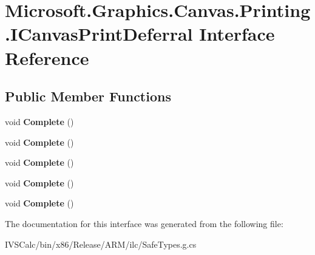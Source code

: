 \hypertarget{interface_microsoft_1_1_graphics_1_1_canvas_1_1_printing_1_1_i_canvas_print_deferral}{}\section{Microsoft.\+Graphics.\+Canvas.\+Printing.\+I\+Canvas\+Print\+Deferral Interface Reference}
\label{interface_microsoft_1_1_graphics_1_1_canvas_1_1_printing_1_1_i_canvas_print_deferral}
\subsection*{Public Member Functions}
\begin{DoxyCompactItemize}
\item 
\mbox{\label{interface_microsoft_1_1_graphics_1_1_canvas_1_1_printing_1_1_i_canvas_print_deferral_ad94fb062f9b4b578b0f9e7ac5c38055e}} 
void {\bfseries Complete} ()
\item 
\mbox{\label{interface_microsoft_1_1_graphics_1_1_canvas_1_1_printing_1_1_i_canvas_print_deferral_ad94fb062f9b4b578b0f9e7ac5c38055e}} 
void {\bfseries Complete} ()
\item 
\mbox{\label{interface_microsoft_1_1_graphics_1_1_canvas_1_1_printing_1_1_i_canvas_print_deferral_ad94fb062f9b4b578b0f9e7ac5c38055e}} 
void {\bfseries Complete} ()
\item 
\mbox{\label{interface_microsoft_1_1_graphics_1_1_canvas_1_1_printing_1_1_i_canvas_print_deferral_ad94fb062f9b4b578b0f9e7ac5c38055e}} 
void {\bfseries Complete} ()
\item 
\mbox{\label{interface_microsoft_1_1_graphics_1_1_canvas_1_1_printing_1_1_i_canvas_print_deferral_ad94fb062f9b4b578b0f9e7ac5c38055e}} 
void {\bfseries Complete} ()
\end{DoxyCompactItemize}


The documentation for this interface was generated from the following file\+:\begin{DoxyCompactItemize}
\item 
I\+V\+S\+Calc/bin/x86/\+Release/\+A\+R\+M/ilc/Safe\+Types.\+g.\+cs\end{DoxyCompactItemize}
